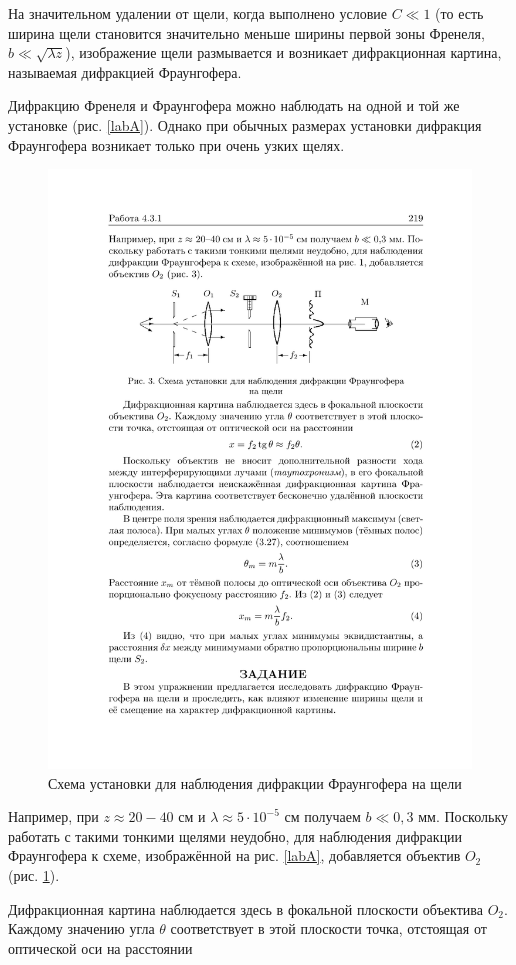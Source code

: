 \documentclass[a4paper, 12pt]{article}%
\begin{document}
	 На значительном удалении от щели, когда выполнено условие $ C \ll 1 $
	 (то есть ширина щели становится значительно меньше ширины первой
	 зоны Френеля, $ b \ll \sqrt{\lambda z} $), изображение щели размывается и возникает
	 дифракционная картина, называемая дифракцией Фраунгофера.
	 
	 Дифракцию Френеля и Фраунгофера можно наблюдать на одной
	 и той же установке (рис. \ref{labA}). Однако при обычных размерах установки дифракция Фраунгофера возникает только при очень узких щелях.
	 
	 \begin{figure}[h!]
	 	\centering
	 	\includegraphics[width=0.8\linewidth]{b.pdf}
	 	\caption{Схема установки для наблюдения дифракции Фраунгофера на щели}
	 	\label{labB}
	 \end{figure}
	 
	 Например, при $ z \approx  20-40 $  см и $  \lambda \approx 5 \cdot 10^{-5}  $   см получаем $  b \ll 0,3 $ мм. Поскольку работать с такими тонкими щелями неудобно, для наблюдения дифракции Фраунгофера к схеме, изображённой на рис. \ref{labA}, добавляется объектив $ O_2  $ (рис. \ref{labB}).
	 
	 Дифракционная картина наблюдается здесь в фокальной плоскости
	 объектива $ O_2 $. Каждому значению угла $ \theta $ соответствует в этой плоскости точка, отстоящая от оптической оси на расстоянии
	 
\end{document}
